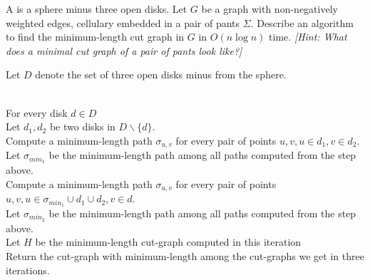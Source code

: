 \documentclass[11pt]{article}
\begin{document}
  A  is a sphere minus three open disks.
  Let \(G\) be a graph with non-negatively weighted edges, cellulary embedded in a pair of pants
  \(\Sigma\).
  Describe an algorithm to find the minimum-length cut graph in \(G\) in \(O(n \log n)\) time.
  \emph{[Hint: What does a minimal cut graph of a pair of pants look like?]}
  \begin{solution}
    Let \(D\) denote the set of three open disks minus from the sphere.
\begin{algo}
    \+
    \\  For every disk \(d\in D\)\+
    \\  Let \(d_1, d_2\) be two disks in \(D\backslash\{d\}\).
    \\  Compute a minimum-length path \(\sigma_{u,v}\) for every pair of points \(u,v, u\in d_1, v\in d_2\).
    \\  Let \(\sigma_{min_1}\) be the minimum-length path among all paths computed from the step above.
    \\  Compute a minimum-length path \(\sigma_{u,v}\) for every pair of points \(u,v, u\in \sigma_{min_1}\cup d_1\cup d_2, v\in d\).
    \\  Let \(\sigma_{min_2}\) be the minimum-length path among all paths computed from the step above.
    \\  Let \(H\) be the minimum-length cut-graph computed in this iteration\-
    \\  Return the cut-graph with minimum-length among the cut-graphs we get in three iterations.\-
\end{algo}
\end{solution}
\end{document}
